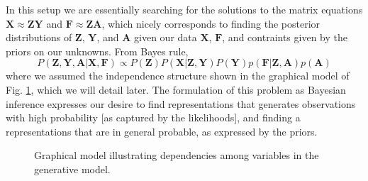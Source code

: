 \documentclass[]{article}
\begin{document}
In this setup we are essentially searching for the solutions to the matrix equations $\mathbf{X} \approx \mathbf{Z}\mathbf{Y}$ and $\mathbf{F} \approx \mathbf{Z}\mathbf{A}$, which nicely corresponds to finding the posterior distributions of $\mathbf{Z}$, $\mathbf{Y}$, and $\mathbf{A}$ given our data $\mathbf{X}$, $\mathbf{F}$, and contraints given by the priors on our unknowns. From Bayes rule, 
\begin{equation}
	P(\mathbf{Z}, \mathbf{Y}, \mathbf{A} | \mathbf{X}, \mathbf{F}) \propto P(\mathbf{Z})P(\mathbf{X}|\mathbf{Z}, \mathbf{Y})P(\mathbf{Y})p(\mathbf{F}|\mathbf{Z},\mathbf{A})p(\mathbf{A})
\end{equation}
where we assumed the independence structure shown in the graphical model of Fig. \ref{fig:graphmod}, which we will detail later. The formulation of this problem as Bayesian inference expresses our desire to find representations that generates observations with high probability [as captured by the likelihoods], and finding a representations that are in general probable, as expressed by the priors. 
\begin{figure}[H]\label{fig:graphmod}
	\begin{center}
	\end{center}
	\caption{Graphical model illustrating dependencies among variables in the generative model.}
\end{figure}	
\end{document}
